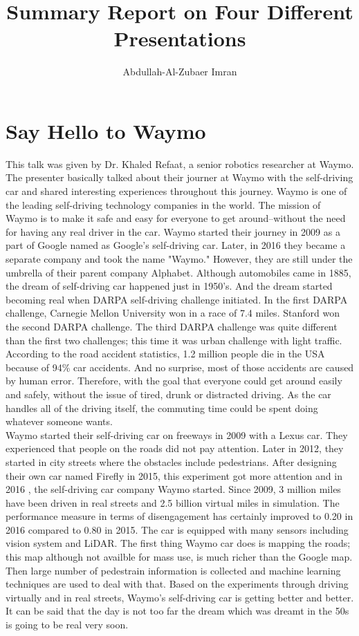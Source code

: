 \documentclass{report}
\title{Summary Report on Four Different Presentations}
\author{Abdullah-Al-Zubaer Imran}
\date{}
\begin{document}
\maketitle

\section{Say Hello to Waymo}
This talk was given by Dr. Khaled Refaat, a senior robotics researcher at Waymo. The presenter basically talked about their journer at Waymo with the self-driving car and shared interesting experiences throughout this journey. Waymo is one of the leading self-driving technology companies in the world. The mission of Waymo is to make it safe and easy for everyone to get around--without the need for having any real driver in the car. Waymo started their journey in 2009 as a part of Google named as Google's self-driving car. Later, in 2016 they became a separate company and took the name "Waymo." However, they are still under the umbrella of their parent company Alphabet. Although automobiles came in 1885, the dream of self-driving car happened just in 1950's. And the dream started becoming real when DARPA self-driving challenge initiated. In the first DARPA challenge, Carnegie Mellon University won in a race of 7.4 miles. Stanford won the second DARPA challenge. The third DARPA challenge was quite different than the first two challenges; this time it was urban challenge with light traffic. According to the road accident statistics, 1.2 million people die in the USA because of 94\% car accidents. And no surprise, most of those accidents are caused by human error. Therefore, with the goal that everyone could get around easily and safely, without the issue of tired, drunk or distracted driving. As the car handles all of the driving itself, the commuting time could be spent doing whatever someone wants.\\

Waymo started their self-driving car on freeways in 2009 with a Lexus car. They experienced that people on the roads did not pay attention. Later in 2012, they started in city streets where the obstacles include pedestrians. After designing their own car named Firefly in 2015, this experiment got more attention and in 2016 , the self-driving car company Waymo started. Since 2009, 3 million miles have been driven in real streets and 2.5 billion virtual miles in simulation. The performance measure in terms of disengagement has certainly improved to 0.20 in 2016 compared to 0.80 in 2015. The car is equipped with many sensors including vision system and LiDAR. The first thing Waymo car does is mapping the roads; this map although not availble for mass use, is much richer than the Google map. Then large number of pedestrain information is collected and machine learning techniques are used to deal with that. Based on the experiments through driving virtually and in real streets, Waymo's self-driving car is getting better and better. It can be said that the day is not too far the dream which was dreamt in the 50s is going to be real very soon.         
\end{document}
